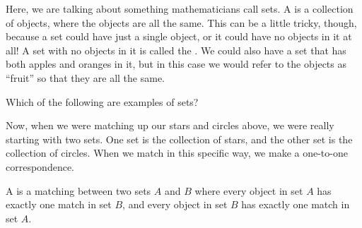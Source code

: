 \documentclass{ximera}
\begin{document}
Here, we are talking about something mathematicians call sets. A  is a collection of objects, where the objects are all the same. This can be a little tricky, though, because a set could have just a single object, or it could have no objects in it at all! A set with no objects in it is called the . We could also have a set that has both apples and oranges in it, but in this case we would refer to the objects as ``fruit'' so that they are all the same.

\begin{question}
Which of the following are examples of sets?
\begin{selectAll}
\end{selectAll}
\end{question}

Now, when we were matching up our stars and circles above, we were really starting with two sets. One set is the collection of stars, and the other set is the collection of circles. When we match in this specific way, we make a one-to-one correspondence.

\begin{definition}
	A  is a matching between two sets $A$ and $B$ where every object in set $A$ has exactly one match in set $B$, and every object in set $B$ has exactly one match in set $A$.
\end{definition}
\end{document}

